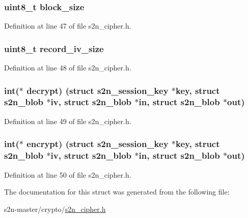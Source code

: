 \subsubsection[{\texorpdfstring{block\+\_\+size}{block_size}}]{\setlength{\rightskip}{0pt plus 5cm}uint8\+\_\+t block\+\_\+size}\hypertarget{structs2n__cbc__cipher_a62e5f3609522c577e2c341f3cce95b5c}{}\label{structs2n__cbc__cipher_a62e5f3609522c577e2c341f3cce95b5c}


Definition at line 47 of file s2n\+\_\+cipher.\+h.

\subsubsection[{\texorpdfstring{record\+\_\+iv\+\_\+size}{record_iv_size}}]{\setlength{\rightskip}{0pt plus 5cm}uint8\+\_\+t record\+\_\+iv\+\_\+size}\hypertarget{structs2n__cbc__cipher_af6c57bc6bf62e1b811c6771a76e38448}{}\label{structs2n__cbc__cipher_af6c57bc6bf62e1b811c6771a76e38448}


Definition at line 48 of file s2n\+\_\+cipher.\+h.

\subsubsection[{\texorpdfstring{decrypt}{decrypt}}]{\setlength{\rightskip}{0pt plus 5cm}int($\ast$ decrypt) (struct {\bf s2n\+\_\+session\+\_\+key} $\ast$key, struct {\bf s2n\+\_\+blob} $\ast$iv, struct {\bf s2n\+\_\+blob} $\ast$in, struct {\bf s2n\+\_\+blob} $\ast$out)}\hypertarget{structs2n__cbc__cipher_afd72553012c67d9a116f2ed5fa7bf00d}{}\label{structs2n__cbc__cipher_afd72553012c67d9a116f2ed5fa7bf00d}


Definition at line 49 of file s2n\+\_\+cipher.\+h.

\subsubsection[{\texorpdfstring{encrypt}{encrypt}}]{\setlength{\rightskip}{0pt plus 5cm}int($\ast$ encrypt) (struct {\bf s2n\+\_\+session\+\_\+key} $\ast$key, struct {\bf s2n\+\_\+blob} $\ast$iv, struct {\bf s2n\+\_\+blob} $\ast$in, struct {\bf s2n\+\_\+blob} $\ast$out)}\hypertarget{structs2n__cbc__cipher_a6154026b061247eb62e699408ec22cab}{}\label{structs2n__cbc__cipher_a6154026b061247eb62e699408ec22cab}


Definition at line 50 of file s2n\+\_\+cipher.\+h.



The documentation for this struct was generated from the following file\+:\begin{DoxyCompactItemize}
\item 
s2n-\/master/crypto/\hyperlink{s2n__cipher_8h}{s2n\+\_\+cipher.\+h}\end{DoxyCompactItemize}
